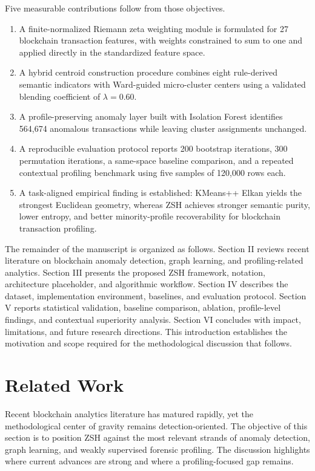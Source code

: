 \documentclass{ieeeaccess}
\begin{document}
Five measurable contributions follow from those objectives.
\begin{enumerate}
\item A finite-normalized Riemann zeta weighting module is formulated for 27 blockchain transaction features, with weights constrained to sum to one and applied directly in the standardized feature space.
\item A hybrid centroid construction procedure combines eight rule-derived semantic indicators with Ward-guided micro-cluster centers using a validated blending coefficient of $\lambda = 0.60$.
\item A profile-preserving anomaly layer built with Isolation Forest identifies 564,674 anomalous transactions while leaving cluster assignments unchanged.
\item A reproducible evaluation protocol reports 200 bootstrap iterations, 300 permutation iterations, a same-space baseline comparison, and a repeated contextual profiling benchmark using five samples of 120,000 rows each.
\item A task-aligned empirical finding is established: KMeans++ Elkan yields the strongest Euclidean geometry, whereas ZSH achieves stronger semantic purity, lower entropy, and better minority-profile recoverability for blockchain transaction profiling.
\end{enumerate}

The remainder of the manuscript is organized as follows. Section II reviews recent literature on blockchain anomaly detection, graph learning, and profiling-related analytics. Section III presents the proposed ZSH framework, notation, architecture placeholder, and algorithmic workflow. Section IV describes the dataset, implementation environment, baselines, and evaluation protocol. Section V reports statistical validation, baseline comparison, ablation, profile-level findings, and contextual superiority analysis. Section VI concludes with impact, limitations, and future research directions. This introduction establishes the motivation and scope required for the methodological discussion that follows.

\section{Related Work}

Recent blockchain analytics literature has matured rapidly, yet the methodological center of gravity remains detection-oriented. The objective of this section is to position ZSH against the most relevant strands of anomaly detection, graph learning, and weakly supervised forensic profiling. The discussion highlights where current advances are strong and where a profiling-focused gap remains.
\end{document}
